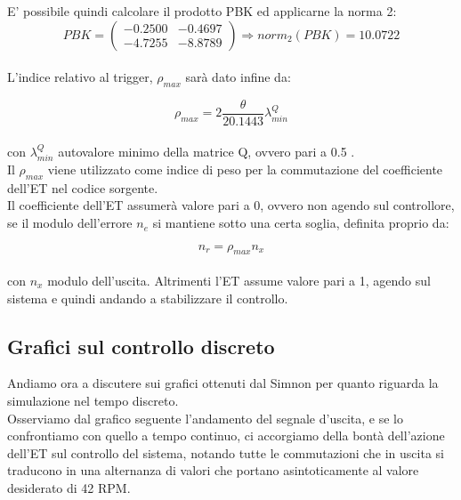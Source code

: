 \documentclass[a4paper,13pt]{article}
\begin{document}
	E' possibile quindi calcolare il prodotto PBK ed applicarne la norma 2:\\
	
\begin{equation*}
	PBK=
\begin{pmatrix}

	-0.2500&-0.4697\\-4.7255&-8.8789

\end{pmatrix}
	\Rightarrow norm_{2}(PBK)=10.0722
\end{equation*}\\

	L'indice relativo al trigger, $\rho_{max}$ sarà dato infine da:
	
\begin{equation*}
	\rho_{max}=2\frac{\theta}{20.1443} \lambda_{min}^{Q}
\end{equation*}\\

	con $\lambda_{min}^{Q}$ autovalore minimo della matrice Q, ovvero pari a 0.5 .\\
	
	Il $\rho_{max}$ viene utilizzato come indice di peso per la commutazione del coefficiente dell'ET nel codice sorgente.
	\\ Il coefficiente dell'ET assumerà valore pari a 0, ovvero non agendo sul controllore, se il modulo dell'errore        	$n_{e}$ si mantiene sotto una certa soglia, definita proprio da:
	
\begin{equation*}
	n_{r}=\rho_{max}n_{x}
\end{equation*} \\

	con $n_{x}$ modulo dell'uscita.
	Altrimenti l'ET assume valore pari a 1, agendo sul sistema e quindi andando a stabilizzare il controllo.
	
\subsection{Grafici sul controllo discreto}
	
	Andiamo ora a discutere sui grafici ottenuti dal Simnon per quanto riguarda la simulazione nel tempo discreto.\\
	Osserviamo dal grafico seguente l'andamento del segnale d'uscita, e se lo confrontiamo con quello a tempo continuo, ci 	accorgiamo della bontà dell'azione dell'ET sul controllo del sistema, notando tutte le commutazioni che in uscita si 		traducono in una alternanza di valori che portano asintoticamente al valore desiderato di 42 RPM.
	
\end{document}
